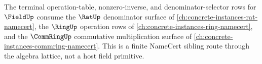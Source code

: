 The terminal operation-table, nonzero-inverse, and denominator-selector rows
for $\FieldUp$ consume the $\RatUp$ denominator surface of
\autoref{ch:concrete-instances-rat-namecert}, the $\RingUp$ operation rows of
\autoref{ch:concrete-instances-ring-namecert}, and the $\CommRingUp$
commutative multiplication surface of
\autoref{ch:concrete-instances-commring-namecert}. This is a finite NameCert
sibling route through the algebra lattice, not a host field primitive.
